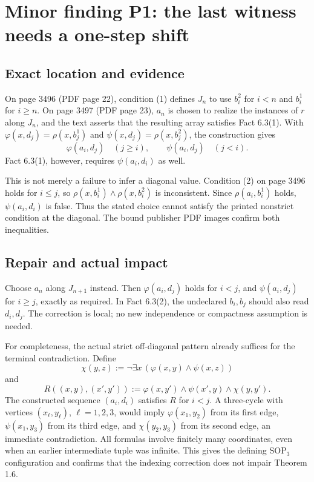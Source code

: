 \documentclass[10pt]{article}
\begin{document}
\section*{Minor finding P1: the last witness needs a one-step shift}
\subsection*{Exact location and evidence}
On page 3496 (PDF page 22), condition (1) defines \(J_n\) to use \(b_i^2\) for \(i<n\) and \(b_i^1\) for \(i\geq n\). On page 3497 (PDF page 23), \(a_n\) is chosen to realize the instances of \(r\) along \(J_n\), and the text asserts that the resulting array satisfies Fact 6.3(1). With \(\varphi(x,d_j)=\rho(x,b_j^1)\) and \(\psi(x,d_j)=\rho(x,b_j^2)\), the construction gives \[\varphi(a_i,d_j)\quad(j\geq i),\qquad
 \psi(a_i,d_j)\quad(j<i).\] Fact 6.3(1), however, requires \(\psi(a_i,d_i)\) as well.\par
This is not merely a failure to infer a diagonal value. Condition (2) on page 3496 holds for \(i\leq j\), so \(\rho(x,b_i^1)\land\rho(x,b_i^2)\) is inconsistent. Since \(\rho(a_i,b_i^1)\) holds, \(\psi(a_i,d_i)\) is false. Thus the stated choice cannot satisfy the printed nonstrict condition at the diagonal. The bound publisher PDF images confirm both inequalities.\par
\subsection*{Repair and actual impact}
Choose \(a_n\) along \(J_{n+1}\) instead. Then \(\varphi(a_i,d_j)\) holds for \(i<j\), and \(\psi(a_i,d_j)\) for \(i\geq j\), exactly as required. In Fact 6.3(2), the undeclared \(b_i,b_j\) should also read \(d_i,d_j\). The correction is local; no new independence or compactness assumption is needed.\par
For completeness, the actual strict off-diagonal pattern already suffices for the terminal contradiction. Define \[\chi(y,z):=\neg\exists x\,(\varphi(x,y)\land\psi(x,z))\] and \[R((x,y),(x',y')):=
 \varphi(x,y')\land\psi(x',y)\land\chi(y,y').\] The constructed sequence \((a_i,d_i)\) satisfies \(R\) for \(i<j\). A three-cycle with vertices \((x_\ell,y_\ell)\), \(\ell=1,2,3\), would imply \(\varphi(x_1,y_2)\) from its first edge, \(\psi(x_1,y_3)\) from its third edge, and \(\chi(y_2,y_3)\) from its second edge, an immediate contradiction. All formulas involve finitely many coordinates, even when an earlier intermediate tuple was infinite. This gives the defining \(\mathrm{SOP}_3\) configuration and confirms that the indexing correction does not impair Theorem 1.6.\par
\end{document}
